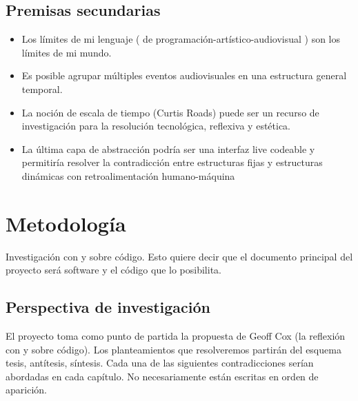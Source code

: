 \subsection{Premisas secundarias}


\begin{itemize}
  
\item Los límites de mi lenguaje ( de programación-artístico-audiovisual ) son los límites de mi mundo.
\item Es posible agrupar múltiples eventos audiovisuales en una estructura general temporal.
\item La noción de escala de tiempo (Curtis Roads) puede ser un recurso de investigación para la resolución tecnológica, reflexiva y estética.

  
\item La última capa de abstracción podría ser una interfaz live codeable y permitiría resolver la contradicción entre estructuras fijas y estructuras dinámicas con retroalimentación humano-máquina


\end{itemize}

\section{Metodología}


Investigación con y sobre código. Esto quiere decir que el documento principal del proyecto será software y el código que lo posibilita.

\subsection{Perspectiva de investigación}

El proyecto toma como punto de partida la propuesta de Geoff Cox (la reflexión con y sobre código). Los planteamientos que resolveremos partirán del esquema tesis, antítesis, síntesis. Cada una de las siguientes contradicciones serían abordadas en cada capítulo. No necesariamente están escritas en orden de aparición.

